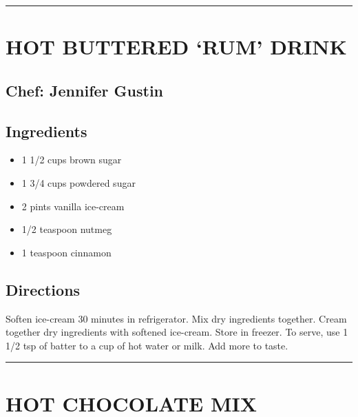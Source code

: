 \documentclass[
]{book}
\providecommand{\tightlist}{%
  \setlength{\itemsep}{0pt}\setlength{\parskip}{0pt}}
\begin{document}
\begin{center}\rule{0.5\linewidth}{0.5pt}\end{center}

\hypertarget{hot-buttered-rum-drink}{%
\section*{HOT BUTTERED `RUM' DRINK}\label{hot-buttered-rum-drink}}


\hypertarget{chef-jennifer-gustin-1}{%
\subsection*{Chef: Jennifer Gustin}\label{chef-jennifer-gustin-1}}


\hypertarget{ingredients-6}{%
\subsection*{Ingredients}\label{ingredients-6}}


\begin{itemize}
\tightlist
\item
  1 1/2 cups brown sugar
\item
  1 3/4 cups powdered sugar
\item
  2 pints vanilla ice-cream
\item
  1/2 teaspoon nutmeg
\item
  1 teaspoon cinnamon
\end{itemize}

\hypertarget{directions-6}{%
\subsection*{Directions}\label{directions-6}}


Soften ice-cream 30 minutes in refrigerator. Mix dry ingredients together. Cream together dry ingredients with softened ice-cream. Store in freezer. To serve, use 1 1/2 tsp of batter to a cup of hot water or milk. Add more to taste.

\begin{center}\rule{0.5\linewidth}{0.5pt}\end{center}

\hypertarget{hot-chocolate-mix}{%
\section*{HOT CHOCOLATE MIX}\label{hot-chocolate-mix}}
\end{document}
